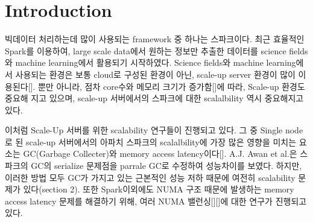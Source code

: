 \section{Introduction} \label{sec:introduction}
\ifkor
빅데이터 처리하는데 많이 사용되는 framework 중 하나는 스파크이다.
최근 효율적인 Spark를 이용하여, large scale data에서 원하는 
정보만 추출한 데이터를 science fields와 machine learning에서 활용되기 시작하였다.
Science fields와 machine learning에서 사용되는 환경은 보통 cloud로 구성된 환경이 아닌,
scale-up server 환경이 많이 이용된다[].
뿐만 아니라, 점차 core수와 메모리 크기가 증가함[]에 따라, 
Scale-up 환경도 중요해 지고 있으며, 
scale-up 서버에서의 스파크에 대한 scalalbility 역시 중요해지고 있다. 
\else

\fi

\ifkor
이처럼 Scale-Up 서버를 위한 scalability 연구들이 진행되고 있다.
그 중 Single node로 된 scale-up 서버에서의 아파치 스파크의 scalalbility에 가장 많은 
영향을 미치는 요소는 GC(Garbage Collecter)와 memory access latency이다[].
A.J. Awan et al.은 스파크의 GC의 serialize 문제점을 parrale GC로 수정하여 성능차이를 
보였다.
하지만, 이러한 방법 모두 GC가 가지고 있는 근본적인 성능 저하 때문에 여전히 
scalability 문제가 있다(section 2). 
또한 Spark이외에도 NUMA 구조 때문에 발생하는 memory access latency 문제를 해결하기 위해,
여러 NUMA 밸런싱[][]에 대한 연구가 진행되고 있다. 
\else


\fi



